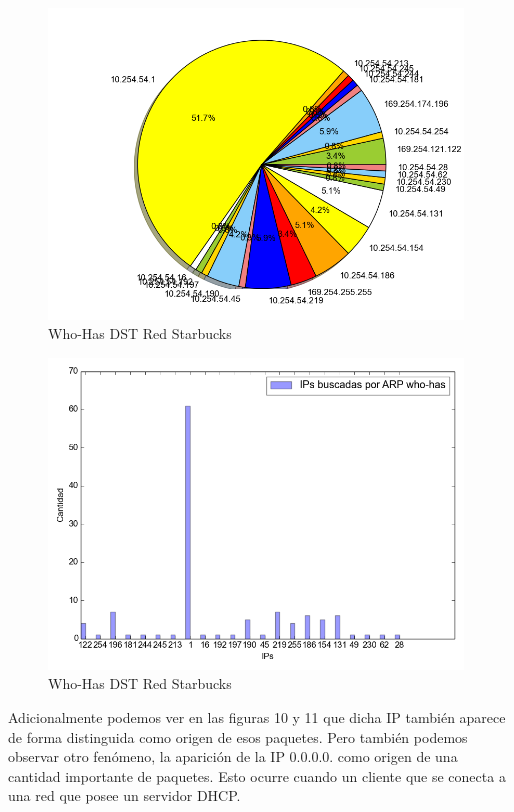 \FloatBarrier
\begin{center}
	\begin{figure}[ht]
    	\centering
		\includegraphics[width=11cm]{imgs/output_robert_starbucks_24-04-2015_p-arp_who_dst-torta.png}
		\caption{Who-Has DST Red Starbucks}
	\end{figure}
\end{center}
\FloatBarrier
\begin{center}
	\begin{figure}[ht]
    	\centering
		\includegraphics[width=11cm]{imgs/output_robert_starbucks_24-04-2015_p-arp_who_dst.png}
		\caption{Who-Has DST Red Starbucks}
	\end{figure}
\end{center}
\FloatBarrier

\newpage
Adicionalmente podemos ver en las figuras 10 y 11 que dicha IP también aparece de forma distinguida como origen de esos paquetes. Pero también podemos observar otro fenómeno, la aparición de la IP 0.0.0.0. como origen de una cantidad importante de paquetes. Esto ocurre cuando un cliente que se conecta a una red que posee un servidor DHCP. 

